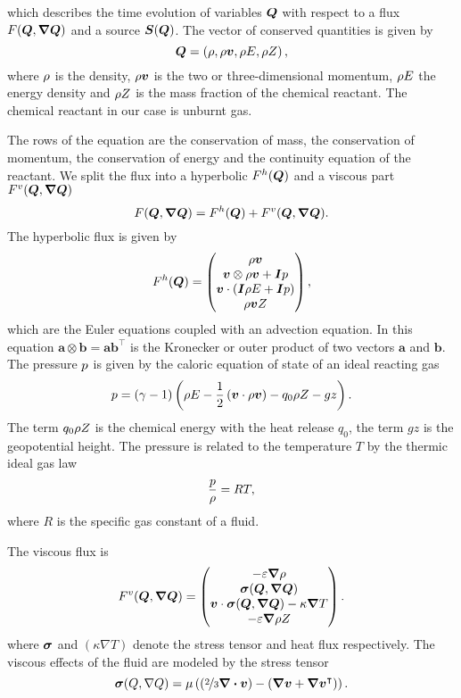 which describes the time evolution of variables $\bm{Q}$ with respect to a flux $\flux(\Q, \gradQ)$ and a source $\source(\Q)$.
The vector of conserved quantities is given by
\begin{equation}
  \label{eq:conserved-variables}
 \bm{Q} = \left( \rho, \rho \bm{v}, \rho E, \rho Z \right),
\end{equation}
where $\rho$ is the density, $\rho \bm{v}$ is the two or three-dimensional momentum, $\rho E$ the energy density and $\rho Z$ is the mass fraction of the chemical reactant.
The chemical reactant in our case is unburnt gas.

The rows of the equation are the conservation of mass, the conservation of momentum, the conservation of energy and the continuity equation of the reactant.
We split the flux into a hyperbolic $F^{h}(\bm{Q})$ and a viscous part $\viscFlux(\Q, \gradQ)$
\begin{equation}
  \label{eq:flux}
  \flux(\Q, \gradQ) = \hyperFlux(\Q) + \viscFlux(\Q, \gradQ).
\end{equation}
The hyperbolic flux is given by
\begin{equation}
  \label{eq:hyper-flux}
  F^{h}(\bm{Q}) = \begin{pmatrix} \rho \bm{v} \\ \bm{v} \otimes \rho \bm{v} + \bm{I} p \\ \bm{v} \cdot (\bm{I} \rho E + \bm{I} p) \\ \rho \bm{v} Z \end{pmatrix},
\end{equation}
which are the Euler equations coupled with an advection equation.
In this equation $\bm{a} \otimes \bm{b} = \bm{a} \bm{b}^\intercal$ is the Kronecker or outer product of two vectors $\bm{a}$ and $\bm{b}$.
The pressure $p$ is given by the caloric equation of state of an ideal reacting gas
\begin{equation}
  \label{eq:eos}
  p = (\gamma - 1) \left(\rho E - \frac{1}{2} \left(\bm{v} \cdot \rho \bm{v} \right)  - q_0 \rho Z - gz \right).
\end{equation}
The term $q_0 \rho Z$ is the chemical energy with the heat release $q_0$, the term $gz$ is the geopotential height.
The pressure is related to the temperature $T$ by the thermic ideal gas law
\begin{equation}
  \label{eq:temperature}
 \frac{p}{\rho} = RT,
\end{equation}
where $R$ is the specific gas constant of a fluid.

The viscous flux is
\begin{equation}
  \label{eq:visc-flux}
  \viscFlux(\Q, \gradQ) = \viscFluxDef.
\end{equation}
where $\bm{\sigma}$ and $(\kappa \nabla T)$ denote the stress tensor and heat flux respectively.
The viscous effects of the fluid are modeled by the stress tensor
\begin{equation}
  \label{eq:stress-tensor}
  \stressT(Q, \nabla Q) =
  \mu
  \left(
  \left(\nicefrac{2}{3} \divergence{\Qv} \right) -
  \left( \gradient{\Qv} + \gradient{\Qv}^\intercal \right)
  \right).
\end{equation}

